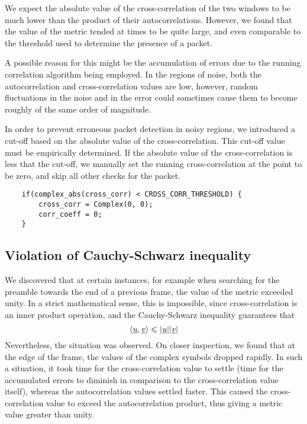 We expect the absolute value of the cross-correlation of the two windows to be
much lower than the product of their autocorrelations. However, we found that
the value of the metric tended at times to be quite large, and even comparable
to the threshold used to determine the presence of a packet.

A possible reason for this might be the accumulation of errors due to the
running correlation algorithm being employed. In the regions of noise, both the
autocorrelation and cross-correlation values are low, however, random
fluctuations in the noise and in the error could sometimes cause them to become
roughly of the same order of magnitude.

In order to prevent erroneous packet detection in noisy regions, we introduced
a cut-off based on the absolute value of the cross-correlation. This cut-off
value must be empirically determined. If the absolute value of the
cross-correlation is less that the cut-off, we manually set the running
cross-correlation at the point to be zero, and skip all other checks for the
packet.

\begin{lstlisting}
	if(complex_abs(cross_corr) < CROSS_CORR_THRESHOLD) {
		cross_corr = Complex(0, 0);
		corr_coeff = 0;
	}
\end{lstlisting}

\subsection{Violation of Cauchy-Schwarz inequality}
\label{subsec:cs-violation}

We discovered that at certain instances, for example when searching for the
preamble towards the end of a previous frame, the value of the metric exceeded
unity. In a strict mathematical sense, this is impossible, since
cross-correlation is an inner product operation, and the Cauchy-Schwarz
inequality guarantees that
$$ \langle \underbar{\emph{u}}, \underbar{\emph{v}} \rangle \leqslant |\underbar{\emph{u}}||\underbar{\emph{v}}| $$
Nevertheless, the situation was observed. On closer inspection, we found that
at the edge of the frame, the values of the complex symbols dropped rapidly. In
such a situation, it took time for the cross-correlation value to settle (time
for the accumulated errors to diminish in comparison to the cross-correlation
value itself), whereas the autocorrelation values settled faster. This caused
the cross-correlation value to exceed the autocorrelation product, thus giving
a metric value greater than unity.

